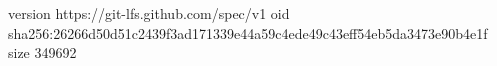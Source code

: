 version https://git-lfs.github.com/spec/v1
oid sha256:26266d50d51c2439f3ad171339e44a59c4ede49c43eff54eb5da3473e90b4e1f
size 349692
